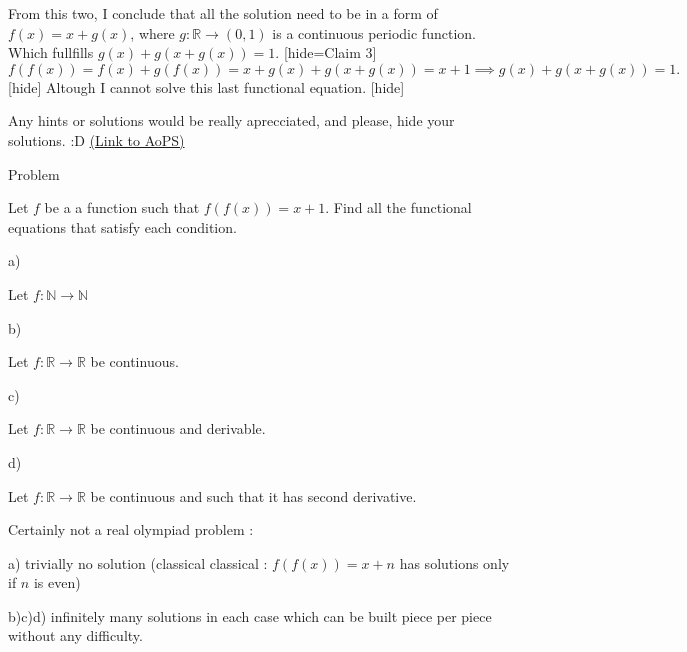 \begin{problem}
From this two, I conclude that all the solution need to be in a form of $f(x) = x+g(x)$, where $g : \mathbb{R} \to (0,1)$ is a continuous periodic function. Which fullfills $g(x)+g(x+g(x))=1$. [hide=Claim 3]
$f(f(x)) = f(x)+g(f(x)) = x+g(x)+g(x+g(x)) = x+1 \implies g(x)+g(x+g(x))=1.$
[\/hide]
Altough I cannot solve this last functional equation.
[\/hide]

Any hints or solutions would be really aprecciated, and please, hide your solutions. :D 
	\flushright \href{https://artofproblemsolving.com/community/c6h1587995}{(Link to AoPS)}
\end{problem}



\begin{solution}
	\begin{tcolorbox}
\begin{bolded}Problem\end{bolded}
Let $f$ be a a function such that $f(f(x))=x+1$. Find all the functional equations that satisfy each condition.

\begin{bolded}a)\end{bolded} Let $f : \mathbb{N} \to \mathbb{N} $
\begin{bolded}b)\end{bolded} Let $f : \mathbb{R} \to \mathbb{R}$ be continuous.
\begin{bolded}c)\end{bolded} Let $f : \mathbb{R} \to \mathbb{R}$ be continuous and derivable.
\begin{bolded}d)\end{bolded} Let $f : \mathbb{R} \to \mathbb{R}$ be continuous and such that it has second derivative.

\end{tcolorbox}

Certainly not a real olympiad problem :

a) trivially no solution (classical classical : $f(f(x))=x+n$ has solutions only if $n$ is even)

b)c)d) infinitely many solutions in each case which can be built piece per piece without any difficulty.
\end{solution}



